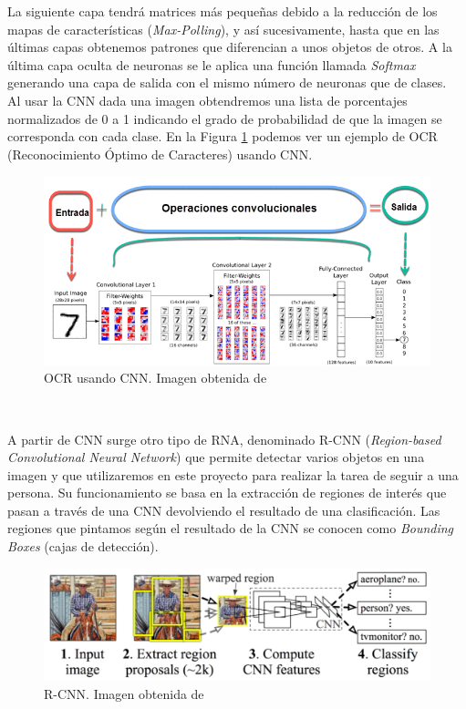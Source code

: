 La siguiente capa tendrá matrices más pequeñas debido a la reducción de los mapas de características (\textit{Max-Polling}), y así sucesivamente, hasta que en las últimas capas obtenemos patrones que diferencian a unos objetos de otros. A la última capa oculta de neuronas se le aplica una función llamada \textit{Softmax} generando una capa de salida con el mismo número de neuronas que de clases.\\

Al usar la CNN dada una imagen obtendremos una lista de porcentajes normalizados de 0 a 1 indicando el grado de probabilidad de que la imagen se corresponda con cada clase. En la Figura \ref{fig:ocr_cnn} podemos ver un ejemplo de OCR (Reconocimiento Óptimo de Caracteres) usando CNN.\\

\begin{figure}[H]
  \begin{center}
    \includegraphics[width=15cm]{imagenes/cap1/ocr-cnn.png}
  \end{center}
  \caption[OCR usando CNN)]{OCR usando CNN. Imagen obtenida de \cite{dnn}}
  \label{fig:ocr_cnn}
\end{figure}\

A partir de CNN surge otro tipo de RNA, denominado R-CNN (\textit{Region-based Convolutional Neural Network}) que permite detectar varios objetos en una imagen y que utilizaremos en este proyecto para realizar la tarea de seguir a una persona. Su funcionamiento se basa en la extracción de regiones de interés que pasan a través de una CNN devolviendo el resultado de una clasificación. Las regiones que pintamos según el resultado de la CNN se conocen como \textit{Bounding Boxes} (cajas de detección).

\begin{figure}[H]
  \begin{center}
    \includegraphics[width=15cm]{imagenes/cap1/r-cnn.png}
  \end{center}
  \caption[Ejemplo de R-CNN]{R-CNN. Imagen obtenida de \cite{r-cnn}}
  \label{fig:r-cnn}
\end{figure}\

